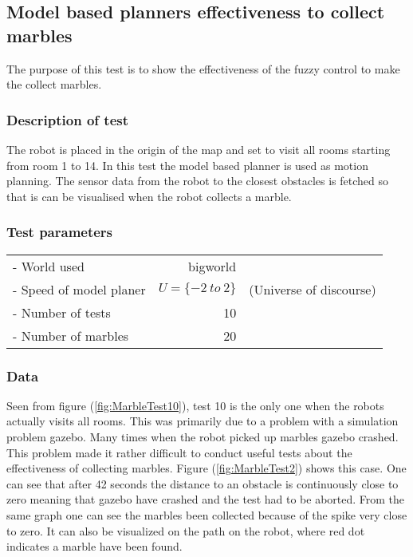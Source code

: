 \documentclass[../Head/Main.tex]{subfiles}
\begin{document}
\subsection{Model based planners effectiveness to collect marbles}
\label{subsec:testCollectMarbles}

The purpose of this test is to show the effectiveness of the fuzzy control to make the collect marbles. 

\subsubsection*{Description of test}  

The robot is placed in the origin of the map and set to visit all rooms starting from room 1 to 14. In this test the model based planner is used as motion planning. The sensor data from the robot to the closest obstacles is fetched so that is can be visualised when the robot collects a marble.         

\subsubsection*{Test parameters}

\begin{tabular}{l r l}
	- World used                & bigworld &\\	
	- Speed of model planer     & $U=\{-2~to~2\}$ & (Universe of discourse)\\
	- Number of tests           & 10 & \\
	- Number of marbles         & 20 &
\end{tabular}

\subsubsection*{Data}
Seen from figure (\ref{fig:MarbleTest10}), test 10 is the only one when the robots actually visits all rooms. This was primarily due to a problem with a simulation problem gazebo. Many times when the robot picked up marbles gazebo crashed. This problem made it rather difficult to conduct useful tests about the effectiveness of collecting marbles. Figure (\ref{fig:MarbleTest2}) shows this case. One can see that after 42 seconds the distance to an obstacle is continuously close to zero meaning that gazebo have crashed and the test had to be aborted. From the same graph one can see the marbles been collected because of the spike very close to zero. It can also be visualized on the path on the robot, where red dot indicates a marble have been found.              
\end{document}
